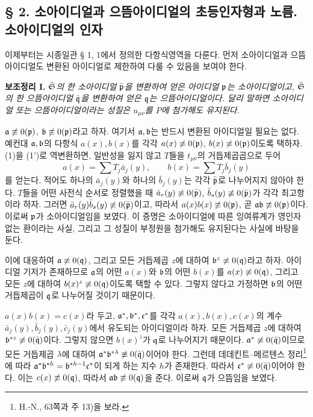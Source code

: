 \subsection*{§ 2. 소아이디얼과 으뜸아이디얼의 초등인자형과 노름. 소아이디얼의 인자}

이제부터는 시종일관 § 1, 1에서 정의한 다항식영역을 다룬다. 먼저 소아이디얼과 으뜸아이디얼도 변환된 아이디얼로 제한하여 다룰 수 있음을 보여야 한다.

\textbf{보조정리 I.} \emph{\(\bar{\mathfrak S}\)의 한 소아이디얼 \(\bar{\mathfrak p}\)을 변환하여 얻은 아이디얼 \(\mathfrak p\)는 소아이디얼이고, \(\bar{\mathfrak S}\)의 한 으뜸아이디얼 \(\bar{\mathfrak q}\)을 변환하여 얻은 \(\mathfrak q\)는 으뜸아이디얼이다. 달리 말하면 소아이디얼 또는 으뜸아이디얼이라는 성질은 \(u_{\mu\nu}\)를 \(P\)에 첨가해도 유지된다.}

\(\mathfrak a\not\equiv0(\mathfrak p)\), \(\mathfrak b\not\equiv0(\mathfrak p)\)라고 하자. 여기서 \(\mathfrak a,\mathfrak b\)는 반드시 변환된 아이디얼일 필요는 없다. 예컨대 \(\mathfrak a,\mathfrak b\)의 다항식 \(a(x),b(x)\)를 각각 \(a(x)\not\equiv0(\mathfrak p)\), \(b(x)\not\equiv0(\mathfrak p)\)이도록 택하자. (1)을 (1')로 역변환하면, 일반성을 잃지 않고 \(T\)들을 \(t_{\mu\nu}\)의 거듭제곱곱으로 두어
\[
 a(x)=\sum T_j \bar a_j(y),\qquad b(x)=\sum T_j \bar b_j(y)
\]
를 얻는다. 적어도 하나의 \(\bar a_j(y)\)와 하나의 \(\bar b_j(y)\)는 각각 \(\bar{\mathfrak p}\)로 나누어지지 않아야 한다. \(T\)들을 어떤 사전식 순서로 정렬했을 때 \(\bar a_r(y)\not\equiv0(\bar{\mathfrak p})\), \(\bar b_s(y)\not\equiv0(\bar{\mathfrak p})\)가 각각 최고항이라 하자. 그러면 \(\bar a_r(y)\bar b_s(y)\not\equiv0(\bar{\mathfrak p})\)이고, 따라서 \(a(x)b(x)\not\equiv0(\mathfrak p)\), 곧 \(\mathfrak a\mathfrak b\not\equiv0(\mathfrak p)\)이다. 이로써 \(\mathfrak p\)가 소아이디얼임을 보였다. 이 증명은 소아이디얼에 따른 잉여류계가 영인자 없는 환이라는 사실, 그리고 그 성질이 부정원을 첨가해도 유지된다는 사실에 바탕을 둔다.

이에 대응하여 \(\mathfrak a\not\equiv0(\mathfrak q)\), 그리고 모든 거듭제곱 \(z\)에 대하여 \(\mathfrak b^z\not\equiv0(\mathfrak q)\)라고 하자. 아이디얼 기저가 존재하므로 \(\mathfrak a\)의 어떤 \(a(x)\)와 \(\mathfrak b\)의 어떤 \(b(x)\)를 \(a(x)\not\equiv0(\mathfrak q)\), 그리고 모든 \(z\)에 대하여 \(b(x)^z\not\equiv0(\mathfrak q)\)이도록 택할 수 있다. 그렇지 않다고 가정하면 \(\mathfrak b\)의 어떤 거듭제곱이 \(\mathfrak q\)로 나누어질 것이기 때문이다.

\(a(x)b(x)=c(x)\)라 두고, \(\mathfrak a^*,\mathfrak b^*,\mathfrak c^*\)를 각각 \(a(x),b(x),c(x)\)의 계수 \(\bar a_j(y),\bar b_j(y),\bar c_j(y)\)에서 유도되는 아이디얼이라 하자. 모든 거듭제곱 \(z\)에 대하여 \(\mathfrak b^{*z}\not\equiv0(\bar{\mathfrak q})\)이다. 그렇지 않으면 \(b(x)^z\)가 \(\mathfrak q\)로 나누어지기 때문이다. \(\mathfrak a^*\not\equiv0(\bar{\mathfrak q})\)이므로 모든 거듭제곱 \(\lambda\)에 대하여 \(\mathfrak a^*\mathfrak b^{*\lambda}\not\equiv0(\bar{\mathfrak q})\)이어야 한다. 그런데 데데킨트--메르텐스 정리\footnote{H.-N., 63쪽과 주 13)을 보라.}에 따라 \(\mathfrak a^*\mathfrak b^{*h}=\mathfrak b^{*h-1}\mathfrak c^*\)이 되게 하는 지수 \(h\)가 존재한다. 따라서 \(\mathfrak c^*\not\equiv0(\bar{\mathfrak q})\)이어야 한다. 이는 \(c(x)\not\equiv0(\mathfrak q)\), 따라서 \(\mathfrak a\mathfrak b\not\equiv0(\mathfrak q)\)을 준다. 이로써 \(\mathfrak q\)가 으뜸임을 보였다.

